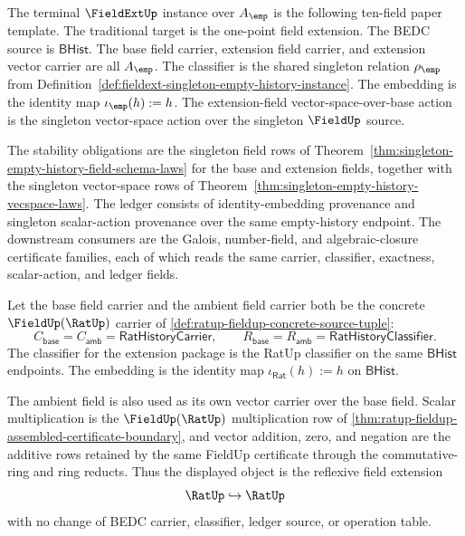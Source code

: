 \begin{definition}
\label{def:fieldext-singleton-obligation-scope}
The terminal $\FieldExtUp$ instance over $A_{\emp}$ is the following ten-field
paper template. The traditional target is the one-point field extension. The BEDC
source is $\mathsf{BHist}$. The base field carrier, extension field carrier, and
extension vector carrier are all $A_{\emp}$. The classifier is the shared
singleton relation $\rho_{\emp}$ from
Definition~\ref{def:fieldext-singleton-empty-history-instance}. The embedding is the
identity map $\iota_{\emp}(h):=h$. The extension-field vector-space-over-base
action is the singleton vector-space action over the singleton $\FieldUp$ source.

The stability obligations are the singleton field rows of
Theorem~\ref{thm:singleton-empty-history-field-schema-laws} for the base and
extension fields, together with the singleton vector-space rows of
Theorem~\ref{thm:singleton-empty-history-vecspace-laws}. The ledger consists of
identity-embedding provenance and singleton scalar-action provenance over the
same empty-history endpoint. The downstream consumers are the Galois,
number-field, and algebraic-closure certificate families, each of which reads the
same carrier, classifier, exactness, scalar-action, and ledger fields.
\end{definition}

\begin{definition}
\label{def:fieldext-reflexive-extension-carrier}
Let the base field carrier and the ambient field carrier both be the concrete
$\FieldUp(\RatUp)$ carrier of
\autoref{def:ratup-fieldup-concrete-source-tuple}:
$$
C_{\mathsf{base}}=C_{\mathsf{amb}}=\mathsf{RatHistoryCarrier},
\qquad
R_{\mathsf{base}}=R_{\mathsf{amb}}=\mathsf{RatHistoryClassifier}.
$$
The classifier for the extension package is the RatUp classifier on the same
$\mathsf{BHist}$ endpoints. The embedding is the identity map
$\iota_{\mathsf{Rat}}(h):=h$ on $\mathsf{BHist}$.

The ambient field is also used as its own vector carrier over the base field.
Scalar multiplication is the $\FieldUp(\RatUp)$ multiplication row of
\autoref{thm:ratup-fieldup-assembled-certificate-boundary}, and vector
addition, zero, and negation are the additive rows retained by the same
FieldUp certificate through the commutative-ring and ring reducts. Thus the
displayed object is the reflexive field extension
$$
\RatUp \hookrightarrow \RatUp
$$
with no change of BEDC carrier, classifier, ledger source, or operation table.
\end{definition}


